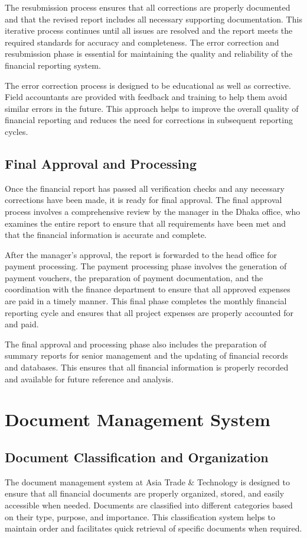 The resubmission process ensures that all corrections are properly documented and that the revised report includes all necessary supporting documentation. This iterative process continues until all issues are resolved and the report meets the required standards for accuracy and completeness. The error correction and resubmission phase is essential for maintaining the quality and reliability of the financial reporting system.

The error correction process is designed to be educational as well as corrective. Field accountants are provided with feedback and training to help them avoid similar errors in the future. This approach helps to improve the overall quality of financial reporting and reduces the need for corrections in subsequent reporting cycles.

\subsection{Final Approval and Processing}
Once the financial report has passed all verification checks and any necessary corrections have been made, it is ready for final approval. The final approval process involves a comprehensive review by the manager in the Dhaka office, who examines the entire report to ensure that all requirements have been met and that the financial information is accurate and complete.

After the manager's approval, the report is forwarded to the head office for payment processing. The payment processing phase involves the generation of payment vouchers, the preparation of payment documentation, and the coordination with the finance department to ensure that all approved expenses are paid in a timely manner. This final phase completes the monthly financial reporting cycle and ensures that all project expenses are properly accounted for and paid.

The final approval and processing phase also includes the preparation of summary reports for senior management and the updating of financial records and databases. This ensures that all financial information is properly recorded and available for future reference and analysis.

\section{Document Management System}

\subsection{Document Classification and Organization}
The document management system at Asia Trade \& Technology is designed to ensure that all financial documents are properly organized, stored, and easily accessible when needed. Documents are classified into different categories based on their type, purpose, and importance. This classification system helps to maintain order and facilitates quick retrieval of specific documents when required.

